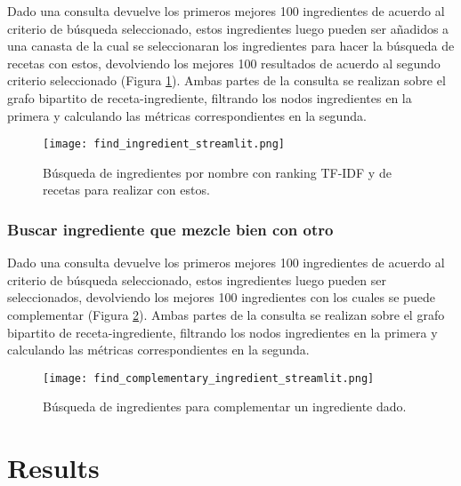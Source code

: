 \documentclass[
	a4paper, %
	10pt, %
	unnumberedsections, %
	twoside, %
]{LTJournalArticle}
\begin{document}
Dado una consulta devuelve los primeros mejores 100 ingredientes de acuerdo al criterio de búsqueda seleccionado,
estos ingredientes luego pueden ser añadidos a una canasta de la cual se seleccionaran los ingredientes para hacer
la búsqueda de recetas con estos, devolviendo los mejores 100 resultados de acuerdo al segundo criterio seleccionado
(Figura \ref{fig:ingredient_search_tfidf}).
Ambas partes de la consulta se realizan sobre el grafo bipartito de receta-ingrediente, filtrando los nodos 
ingredientes en la primera y calculando las métricas correspondientes en la segunda.

\begin{figure} %
	\texttt{[image: find\_ingredient\_streamlit.png]}
	\caption{Búsqueda de ingredientes por nombre con ranking TF-IDF y de recetas para realizar con estos.}
	\label{fig:ingredient_search_tfidf}
\end{figure}

\subsubsection{Buscar ingrediente que mezcle bien con otro}

Dado una consulta devuelve los primeros mejores 100 ingredientes de acuerdo al criterio de búsqueda seleccionado,
estos ingredientes luego pueden ser seleccionados, devolviendo los mejores 100 ingredientes con los cuales se puede 
complementar (Figura \ref{fig:complementary_ingredient_search_tfidf}).
Ambas partes de la consulta se realizan sobre el grafo bipartito de receta-ingrediente, filtrando los nodos 
ingredientes en la primera y calculando las métricas correspondientes en la segunda.


\begin{figure} %
	\texttt{[image: find\_complementary\_ingredient\_streamlit.png]}
	\caption{Búsqueda de ingredientes para complementar un ingrediente dado.}
	\label{fig:complementary_ingredient_search_tfidf}
\end{figure}

\section{Results}

\end{document}
